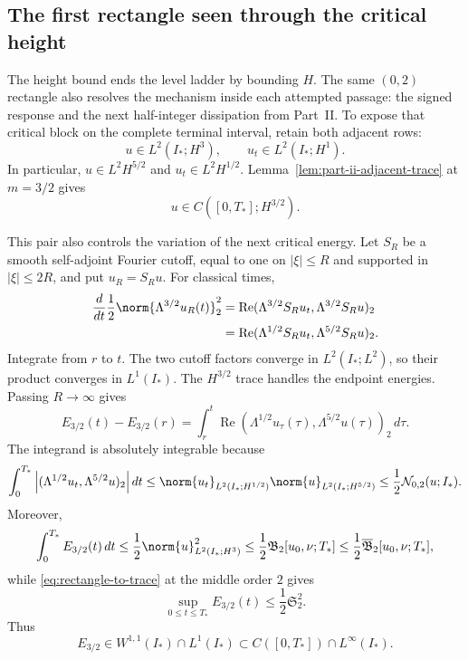 \subsection{The first rectangle seen through the critical height}

The height bound ends the level ladder by bounding \(H\).  The same
\((0,2)\) rectangle also resolves the mechanism inside each attempted
passage: the signed response and the next half-integer dissipation from
Part~II.  To expose that critical block on the complete terminal interval,
retain both adjacent rows:
\begin{equation*}
 u\in L^2(I_*;H^3),
 \qquad
 u_t\in L^2(I_*;H^1).
\end{equation*}
In particular, \(u\in L^2H^{5/2}\) and
\(u_t\in L^2H^{1/2}\).  Lemma~\ref{lem:part-ii-adjacent-trace} at
\(m=3/2\) gives
\[
 u\in C([0,T_*];H^{3/2}).
\]

This pair also controls the variation of the next critical energy.  Let
\(S_R\) be a smooth self-adjoint Fourier cutoff, equal to one on
\(|\xi|\le R\) and supported in \(|\xi|\le2R\), and put \(u_R=S_Ru\).
For classical times,
\begin{align*}
 \frac d{dt}\frac12\norm{\Lambda^{3/2}u_R(t)}_2^2
 &=\operatorname{Re}
   (\Lambda^{3/2}S_Ru_t,\Lambda^{3/2}S_Ru)_2\\
 &=\operatorname{Re}
   (\Lambda^{1/2}S_Ru_t,\Lambda^{5/2}S_Ru)_2.
\end{align*}
Integrate from \(r\) to \(t\).  The two cutoff factors converge in
\(L^2(I_*;L^2)\), so their product converges in \(L^1(I_*)\).  The
\(H^{3/2}\) trace handles the endpoint energies.  Passing \(R\to\infty\)
gives
\begin{equation*}
 E_{3/2}(t)-E_{3/2}(r)
 =\int_r^t\operatorname{Re}
 (\Lambda^{1/2}u_\tau(\tau),\Lambda^{5/2}u(\tau))_2\,d\tau.
\end{equation*}
The integrand is absolutely integrable because
\begin{equation*}
 \int_0^{T_*}
 \left|(\Lambda^{1/2}u_t,\Lambda^{5/2}u)_2\right|dt
 \le
 \norm{u_t}_{L^2(I_*;H^{1/2})}
 \norm{u}_{L^2(I_*;H^{5/2})}
 \le\frac12\mathcal N_{0,2}(u;I_*).
\end{equation*}
Moreover,
\begin{equation}
 \int_0^{T_*}E_{3/2}(t)\,dt
 \le\frac12\norm{u}_{L^2(I_*;H^3)}^2
 \le\frac12\mathfrak B_2[u_0,\nu;T_*]
 \le\frac12\overline{\mathfrak B}_2[u_0,\nu;T_*],
 \label{eq:quantitative-critical-dissipation}
\end{equation}
while \eqref{eq:rectangle-to-trace} at the middle order \(2\) gives
\begin{equation}
 \sup_{0\le t\le T_*}E_{3/2}(t)
 \le\frac12\mathfrak S_2^2.
 \label{eq:quantitative-next-critical-height}
\end{equation}
Thus
\begin{equation*}
 E_{3/2}\in W^{1,1}(I_*)\cap L^1(I_*)
 \subset C([0,T_*])\cap L^\infty(I_*).
\end{equation*}

